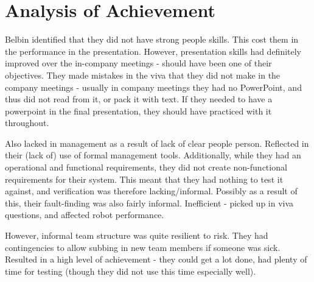 

\section{Analysis of Achievement}\label{sec:achievement}
    Belbin identified that they did not have strong people skills.
    This cost them in the performance in the presentation.
    However, presentation skills had definitely improved over the in-company meetings - should have been one of their objectives.
    They made mistakes in the viva that they did not make in the company meetings - usually in company meetings they had no PowerPoint, and thus did not read from it, or pack it with text.
    If they needed to have a powerpoint in the final presentation, they should have practiced with it throughout.

    Also lacked in management as a result of lack of clear people person.
    Reflected in their (lack of) use of formal management tools.
    Additionally, while they had an operational and functional requirements, they did not create non-functional requirements for their system.
    This meant that they had nothing to test it against, and verification was therefore lacking/informal.
    Possibly as a result of this, their fault-finding was also fairly informal.
    Inefficient - picked up in viva questions, and affected robot performance.

    However, informal team structure was quite resilient to risk.
    They had contingencies to allow subbing in new team members if someone was sick.
    Resulted in a high level of achievement - they could get a lot done, had plenty of time for testing (though they did not use this time especially well).



